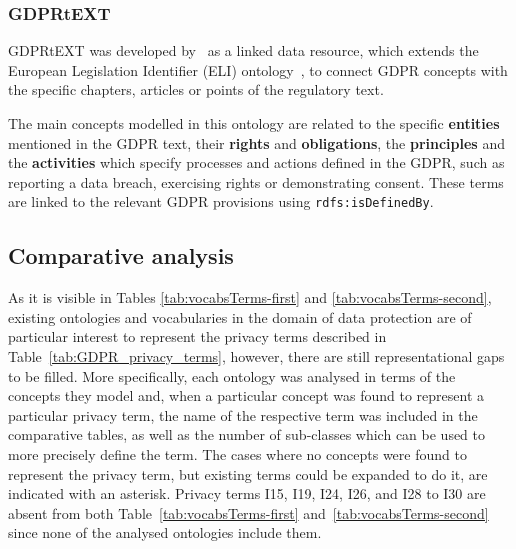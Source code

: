 \subsubsection{GDPRtEXT}
\label{sec:gdprtext}

GDPRtEXT was developed by~\cite{gangemi_gdprtext_2018} as a linked data resource, which extends the European Legislation Identifier (ELI) ontology~\citep{office_of_publications_on_eur-lex_eu_2017}, to connect GDPR concepts with the specific chapters, articles or points of the regulatory text.

The main concepts modelled in this ontology are related to the specific \textbf{entities} mentioned in the GDPR text, their \textbf{rights} and \textbf{obligations}, the \textbf{principles} and the \textbf{activities} which specify processes and actions defined in the GDPR, such as reporting a data breach, exercising rights or demonstrating consent.
These terms are linked to the relevant GDPR provisions using \texttt{rdfs:isDefinedBy}.

\subsection{Comparative analysis}
\label{sec:sota_vocabularies_analysis}

As it is visible in Tables \ref{tab:vocabsTerms-first} and \ref{tab:vocabsTerms-second}, existing ontologies and vocabularies in the domain of data protection are of particular interest to represent the privacy terms described in Table~\ref{tab:GDPR_privacy_terms}, however, there are still representational gaps to be filled.
More specifically, each ontology was analysed in terms of the concepts they model and, when a particular concept was found to represent a particular privacy term, the name of the respective term was included in the comparative tables, as well as the number of sub-classes which can be used to more precisely define the term.
The cases where no concepts were found to represent the privacy term, but existing terms could be expanded to do it, are indicated with an asterisk.
Privacy terms I15, I19, I24, I26, and I28 to I30 are absent from both Table~\ref{tab:vocabsTerms-first} and~\ref{tab:vocabsTerms-second} since none of the analysed ontologies include them.

